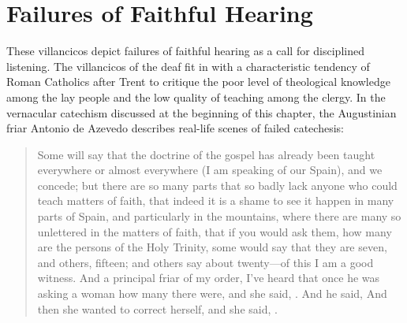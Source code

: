 \section{Failures of Faithful Hearing}

These villancicos depict failures of faithful hearing as a call for disciplined
listening.
The villancicos of the deaf fit in with a characteristic tendency of Roman
Catholics after Trent to critique the poor level of theological knowledge among
the lay people and the low quality of teaching among the clergy.%
    \Autocite[56--57]{Kamen:EarlyModernSociety}
In the vernacular catechism discussed at the beginning of this chapter, the
Augustinian friar Antonio de Azevedo describes real-life scenes of failed
catechesis: 
\begin{quote}
    Some will say that the doctrine of the gospel has already been taught
    everywhere or almost everywhere (I am speaking of our Spain), and we
    concede; but there are so many parts that so badly lack anyone who could
    teach matters of faith, that indeed it is a shame to see it happen in many
    parts of Spain, and particularly in the mountains, where there are many so
    unlettered  in the matters of faith, that if you would ask
    them, how many are the persons of the Holy Trinity, some would say that they
    are seven, and others, fifteen; and others say about twenty---of this I am a
    good witness.
    And a principal friar of my order, I've heard that once he was asking a
    woman how many  there were, and she said,
    . 
    And he said,  
    And then she wanted to correct herself, and she said, .%
        \Autocite
        [26: .]
        {Azevedo:Catecismo}
\end{quote}

